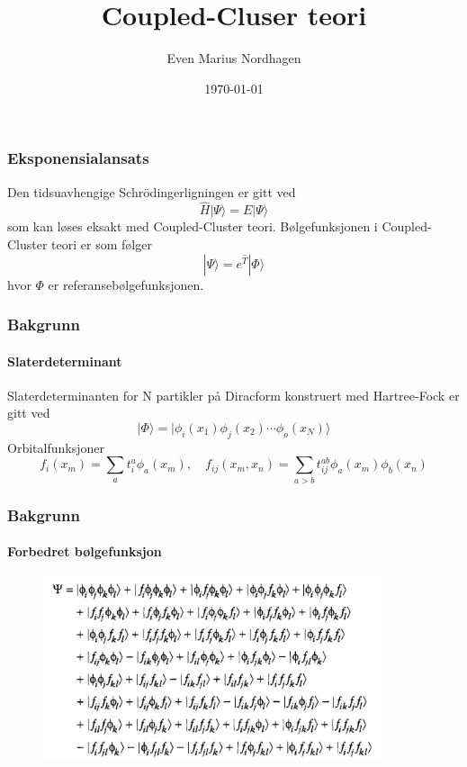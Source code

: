 \documentclass[norsk,a4paper,12pt]{beamer}
\title{Coupled-Cluser teori}
\author{Even Marius Nordhagen}
\institute{Universitetet i Oslo}
\date{\today}
\begin{document}
\frame{\titlepage}

  \begin{frame}
    \frametitle{Eksponensialansats}
    Den tidsuavhengige Schrödingerligningen er gitt ved
    \begin{equation}
    \hat{H}|\Psi\rangle=E|\Psi\rangle
    \end{equation}
    som kan løses eksakt med Coupled-Cluster teori. Bølgefunksjonen i Coupled-Cluster teori er som følger
    \begin{equation}
    |\Psi\rangle=e^{\hat{T}}|\Phi\rangle
    \end{equation}
    hvor $\Phi$ er referansebølgefunksjonen. 
  \end{frame}
  
  \begin{frame}
    \frametitle{Bakgrunn}
    \framesubtitle{Slaterdeterminant}
    Slaterdeterminanten for N partikler på Diracform konstruert med Hartree-Fock er gitt ved
    \begin{equation}
    |\Phi\rangle=|\phi_i(x_1)\phi_j(x_2)\cdots\phi_o(x_N)\rangle
    \end{equation}
    Orbitalfunksjoner
    \begin{equation}
    f_i(x_m)=\sum_a t_i^a\phi_a(x_m),\quad f_{ij}(x_m,x_n)=\sum_{a>b}t_{ij}^{ab}\phi_a(x_m)\phi_b(x_n)
    \end{equation}
  \end{frame}
  
  \begin{frame}
    \frametitle{Bakgrunn}
    \framesubtitle{Forbedret bølgefunksjon}
    \begin{figure}[h]
    \centering
    \includegraphics[width=100mm]{total_wf.png}
    \end{figure}
  \end{frame}
  
\end{document}
